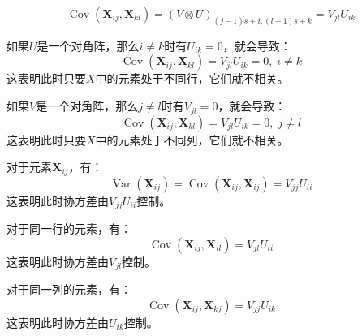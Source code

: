 \begin{equation*}
	\operatorname{Cov}(\mathbf{X}_{ij},\mathbf{X}_{kl})=(V\otimes U)_{(j-1)s+i,(l-1)s+k}=V_{jl}U_{ik}
\end{equation*}\par
如果$U$是一个对角阵，那么$i\ne k$时有$U_{ik}=0$，就会导致：
\begin{equation*}
	\operatorname{Cov}(\mathbf{X}_{ij},\mathbf{X}_{kl})=V_{jl}U_{ik}=0,\;i\ne k
\end{equation*}
这表明此时只要$X$中的元素处于不同行，它们就不相关。\par
如果$V$是一个对角阵，那么$j\ne l$时有$V_{jl}=0$，就会导致：
\begin{equation*}
	\operatorname{Cov}(\mathbf{X}_{ij},\mathbf{X}_{kl})=V_{jl}U_{ik}=0,\;j\ne l
\end{equation*}
这表明此时只要$X$中的元素处于不同列，它们就不相关。\par
对于元素$\mathbf{X}_{ij}$，有：
\begin{equation*}
	\operatorname{Var}(\mathbf{X}_{ij})=\operatorname{Cov}(\mathbf{X}_{ij},\mathbf{X}_{ij})=V_{jj}U_{ii}
\end{equation*}
这表明此时协方差由$V_{jj}U_{ii}$控制。\par
对于同一行的元素，有：
\begin{equation*}
	\operatorname{Cov}(\mathbf{X}_{ij},\mathbf{X}_{il})=V_{jl}U_{ii}
\end{equation*}
这表明此时协方差由$V_{jl}$控制。\par
对于同一列的元素，有：
\begin{equation*}
	\operatorname{Cov}(\mathbf{X}_{ij},\mathbf{X}_{kj})=V_{jj}U_{ik}
\end{equation*}
这表明此时协方差由$U_{ik}$控制。
